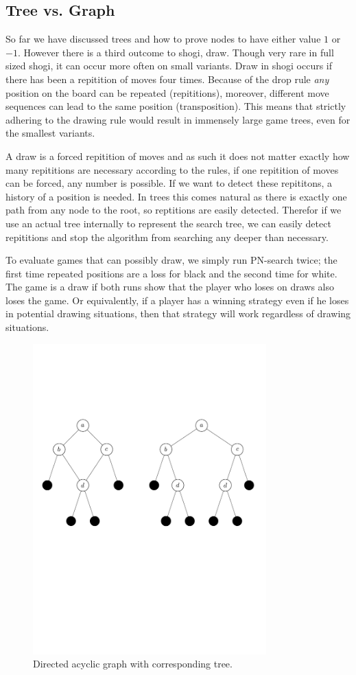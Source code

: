 \documentclass{article}
\begin{document}
\subsection{Tree vs. Graph}
\label{sec:treegraph}
So far we have discussed trees and how to prove nodes to have either value $1$ or $-1$. However there is a third outcome to shogi, draw. Though
very rare in full sized shogi, it can occur more often on small variants. Draw in shogi occurs if there has been a repitition
of moves four times. Because of the drop rule \textit{any} position on the board can be repeated (repititions), moreover, different move
sequences can lead to the same position (transposition). This means that strictly adhering to the drawing rule would result in immensely large game trees,
even for the smallest variants.

A draw is a forced repitition of moves and as such it does not matter exactly how many repititions are necessary according to the rules,
if one repitition of moves can be forced, any number is possible. If we want to detect these repititons, a history of a position is needed. In trees this
comes natural as there is exactly one path from any node to the root, so reptitions are easily detected. Therefor if we use an actual tree internally
to represent the search tree, we can easily detect repititions and stop the algorithm from searching any deeper than necessary.

To evaluate games that can possibly draw, we simply run PN-search twice; the first time repeated positions are a loss for black and the second time for white.
The game is a draw if both runs show that the player who loses on draws also loses the game. Or equivalently, if a player has a winning strategy
even if he loses in potential drawing situations, then that strategy will work regardless of drawing situations.\\

\begin{figure}[h]
\center
\includegraphics[trim = 0mm 10cm 0cm 0cm, clip, width=9cm]{treevsgraph.pdf}
\caption{Directed acyclic graph with corresponding tree.}
\label{treevsgraph}
\end{figure}
\end{document}
